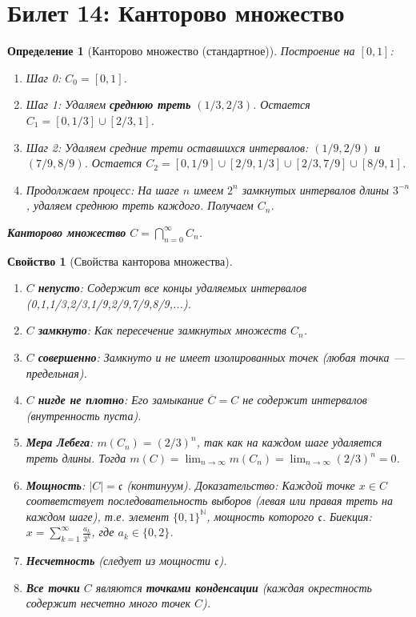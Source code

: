\documentclass[a4paper, 12pt]{article}
\newtheorem{definition}{Определение}
\newtheorem{property}{Свойство}
\newcommand{\N}{\mathbb{N}}
\newcommand{\1}{\mathbf{1}}
\begin{document}
\section*{Билет 14: Канторово множество}
\begin{definition}[Канторово множество (стандартное)]
    Построение на $[0,1]$:
    \begin{enumerate}
        \item Шаг 0: $C_0 = [0,1]$.
        \item Шаг 1: Удаляем \textbf{среднюю треть} $(1/3, 2/3)$. Остается $C_1 = [0,1/3] \cup [2/3,1]$.
        \item Шаг 2: Удаляем средние трети оставшихся интервалов: $(1/9, 2/9)$ и $(7/9, 8/9)$. Остается $C_2 = [0,1/9] \cup [2/9,1/3] \cup [2/3,7/9] \cup [8/9,1]$.
        \item Продолжаем процесс: На шаге $n$ имеем $2^n$ замкнутых интервалов длины $3^{-n}$, удаляем среднюю треть каждого. Получаем $C_n$.
    \end{enumerate}
    \textbf{Канторово множество} $C = \bigcap_{n=0}^{\infty} C_n$.
\end{definition}

\begin{property}[Свойства канторова множества]
    \hfill
    \begin{enumerate}[label=(\arabic*)]
        \item $C$ \textbf{непусто}: Содержит все концы удаляемых интервалов (0,1,1/3,2/3,1/9,2/9,7/9,8/9,...).
        \item $C$ \textbf{замкнуто}: Как пересечение замкнутых множеств $C_n$.
        \item $C$ \textbf{совершенно}: Замкнуто и не имеет изолированных точек (любая точка — предельная).
        \item $C$ \textbf{нигде не плотно}: Его замыкание $\overline{C} = C$ не содержит интервалов (внутренность пуста).
        \item \textbf{Мера Лебега}: $m(C_n) = (2/3)^n$, так как на каждом шаге удаляется треть длины. Тогда $m(C) = \lim_{n \to \infty} m(C_n) = \lim_{n \to \infty} (2/3)^n = 0$.
        \item \textbf{Мощность}: $|C| = \mathfrak{c}$ (континуум). Доказательство: Каждой точке $x \in C$ соответствует последовательность выборов (левая или правая треть на каждом шаге), т.е. элемент $\{0,1\}^{\N}$, мощность которого $\mathfrak{c}$. Биекция: $x = \sum_{k=1}^{\infty} \frac{a_k}{3^k}$, где $a_k \in \{0,2\}$.
        \item \textbf{Несчетность} (следует из мощности $\mathfrak{c}$).
        \item \textbf{Все точки} $C$ являются \textbf{точками конденсации} (каждая окрестность содержит несчетно много точек $C$).
    \end{enumerate}
\end{property}
\end{document}
